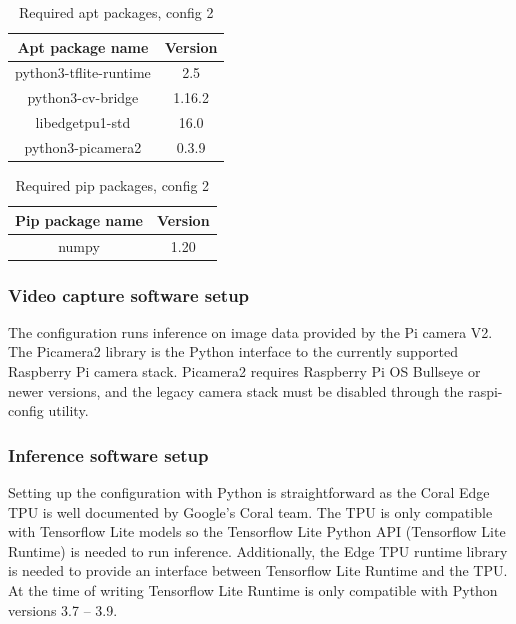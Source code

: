 \begin{table}[H]
\centering
\begin{tabular}
{ |c|c| } 
\hline
\textbf{Apt package name} & \textbf{Version} \\
\hline
python3-tflite-runtime & 2.5\\
\hline
python3-cv-bridge & 1.16.2\\
\hline
libedgetpu1-std & 16.0\\
\hline
python3-picamera2 & 0.3.9\\
\hline

\end{tabular}
\caption{Required apt packages, config 2}
\label{tab:config2_apt_packages}
\end{table}

\begin{table}[H]
\centering
\begin{tabular}
{ |c|c| } 
\hline
\textbf{Pip package name} & \textbf{Version} \\
\hline
numpy & 1.20\\
\hline
\end{tabular}
\caption{Required pip packages, config 2}
\label{tab:config2_pip_packages}
\end{table}


\subsubsection{Video capture software setup}

The configuration runs inference on image data provided by the Pi camera V2. The Picamera2 library is the Python interface to the currently supported Raspberry Pi camera stack. Picamera2 requires Raspberry Pi OS Bullseye or newer versions, and the legacy camera stack must be disabled through the raspi-config utility.\\

\subsubsection{Inference software setup}

Setting up the configuration with Python is straightforward as the Coral Edge TPU is well documented by Google’s Coral team. The TPU is only compatible with Tensorflow Lite models so the Tensorflow Lite Python API (Tensorflow Lite Runtime) is needed to run inference. Additionally, the Edge TPU runtime library is needed to provide an interface between Tensorflow Lite Runtime and the TPU. At the time of writing Tensorflow Lite Runtime is only compatible with Python versions 3.7 – 3.9.\\

